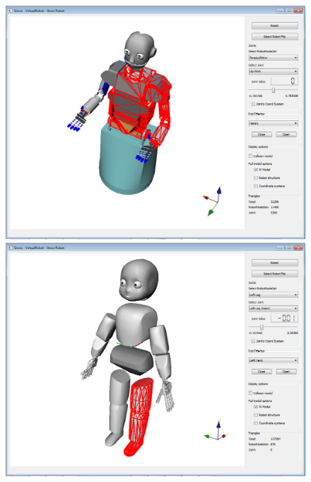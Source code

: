 \par
\begin{figure}[H]
	\centering
	\begin{minipage} {.45\linewidth}
	  \includegraphics[width=\linewidth]{Tutorial8}
	\end{minipage}
	\begin{minipage} {.45\linewidth}
	  \includegraphics[width=\linewidth]{Tutorial8b}
	\end{minipage}
\end{figure}
\par
